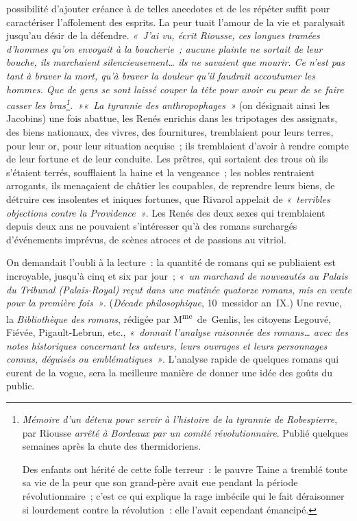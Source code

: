 \documentclass[french,twoside]{book} %
\begin{document}
\label{p587}possibilité d’ajouter créance à de telles anecdotes et de les répéter suffit pour caractériser l’affolement des esprits. La peur tuait l’amour de la vie et paralysait jusqu’au désir de la défendre. \emph{« J’ai vu, écrit Riousse, ces longues tramées d’hommes qu’on envoyait à la boucherie ; aucune plainte ne sortait de leur bouche, ils marchaient silencieusement… {\itshape ils ne savaient que mourir}. Ce n’est pas tant à braver la mort, qu’à braver la douleur qu’il faudrait accoutumer les hommes. Que de gens se sont laissé couper la tête pour avoir eu peur de se faire casser les bras\footnote{\noindent \emph{Mémoire d’un détenu pour servir à l’histoire de la tyrannie de Robespierre}, par Riousse {\itshape arrêté à Bordeaux par un comité révolutionnaire}. Publié quelques semaines après la chute des thermidoriens.\par
Des enfants ont hérité de cette folle terreur : le pauvre Taine a tremblé toute sa vie de la peur que son grand-père avait eue pendant la période révolutionnaire ; c’est ce qui explique la rage imbécile qui le fait déraisonner si lourdement contre la révolution : elle l’avait cependant émancipé.
}. »« La tyrannie des {\itshape anthropophages} »} (on désignait ainsi les Jacobins) une fois abattue, les Renés enrichis dans les tripotages des assignats, des biens nationaux, des vivres, des fournitures, tremblaient pour leurs terres, pour leur or, pour leur situation acquise ; ils tremblaient d’avoir à rendre compte de leur fortune et de leur conduite. Les prêtres, qui sortaient des trous où ils s’étaient terrés, soufflaient la haine et la vengeance ; les nobles rentraient arrogants, ils menaçaient de châtier les coupables, de reprendre leurs biens, de détruire ces insolentes et iniques fortunes, que Rivarol appelait de \emph{« terribles objections contre la Providence »}. Les Renés des deux sexes qui tremblaient depuis deux ans ne pouvaient s’intéresser qu’à des romans surchargés d’événements imprévus, de scènes atroces et de passions au vitriol.\par
On demandait l’oubli à la lecture : la quantité de romans qui se publiaient est incroyable, jusqu’à cinq et six par jour ; \emph{« un marchand de nouveautés au Palais du Tribunal (Palais-Royal) reçut dans une matinée quatorze romans, mis en vente pour la première fois »}. (\emph{Décade philosophique}, 10 messidor an IX.) Une revue, la \emph{Bibliothèque des romans}, rédigée par M\textsuperscript{me} de Genlis, les citoyens Legouvé, Fiévée, Pigault-Lebrun, etc., \emph{« donnait l’analyse raisonnée des romans… avec des notes historiques concernant les auteurs, leurs ouvrages et leurs personnages connus, déguisés ou emblématiques »}. L’analyse rapide de quelques romans qui eurent de la vogue, sera la meilleure manière de donner une idée des goûts du public.\par
\end{document}
